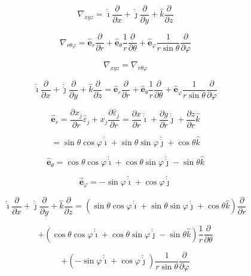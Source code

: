 \documentclass[12pt]{article}
\begin{document}
\[
    \nabla_{xyz} =  \hat{\dot{\imath}} \frac{\partial}{\partial x}
    + \hat{\dot{\jmath}} \frac{\partial}{\partial y}
    +  \hat{k} \frac{\partial}{\partial z}
\]

\[
    \nabla_{r \theta \varphi } = \hat{\textbf{e}}_r \frac{\partial}{\partial r}
    + \hat{\textbf{e}}_\theta \frac{1}{r} \frac{\partial}{\partial \theta}
    + \hat{\textbf{e}}_\varphi \frac{1}{r \sin{\theta}} \frac{\partial}{\partial \varphi}
\]

\[
    \nabla_{xyz} = \nabla_{r \theta \varphi }
\]

\[
    \hat{\dot{\imath}} \frac{\partial}{\partial x}
    + \hat{\dot{\jmath}} \frac{\partial}{\partial y}
    +  \hat{k} \frac{\partial}{\partial z} = \hat{\textbf{e}}_r \frac{\partial}{\partial r}
    + \hat{\textbf{e}}_\theta \frac{1}{r} \frac{\partial}{\partial \theta}
    + \hat{\textbf{e}}_\varphi \frac{1}{r \sin{\theta}} \frac{\partial}{\partial \varphi}
\]

\[
    \hat{\textbf{e}}_r = \frac{\partial x_j}{\partial r} \hat{\varepsilon}_j
    + x_j \frac{\partial \hat{\varepsilon}_j}{\partial r} = \frac{\partial x}{\partial r} \hat{\dot{\imath}}
    + \frac{\partial y}{\partial r} \hat{\dot{\jmath}} + \frac{\partial z}{\partial r} \hat{k}
\]

\[
    = \sin{\theta} \cos{\varphi} \hat{\dot{\imath}} + \sin{\theta} \sin{\varphi} \hat{\dot{\jmath}}
    + \cos{\theta} \hat{k}
\]

\[
    \hat{\textbf{e}}_\theta = \cos{\theta} \cos{\varphi} \hat{\dot{\imath}}
    + \cos{\theta} \sin{\varphi} \hat{\dot{\jmath}} - \sin{\theta} \hat{k}
\]

\[
    \hat{\textbf{e}}_\varphi = -\sin{\varphi} \hat{\dot{\imath}} + \cos{\varphi} \hat{\dot{\jmath}}
\]

\[
    \hat{\dot{\imath}} \frac{\partial}{\partial x} + \hat{\dot{\jmath}} \frac{\partial}{\partial y}
    +  \hat{k} \frac{\partial}{\partial z} =
    \left(
    \sin{\theta} \cos{\varphi} \hat{\dot{\imath}}
    + \sin{\theta} \sin{\varphi} \hat{\dot{\jmath}}
    + \cos{\theta} \hat{k}
    \right)  \frac{\partial}{\partial r}
\]

\[
    + \left(
    \cos{\theta} \cos{\varphi} \hat{\dot{\imath}} + \cos{\theta} \sin{\varphi} \hat{\dot{\jmath}}
    - \sin{\theta} \hat{k}
    \right) \frac{1}{r} \frac{\partial}{\partial \theta}
\]

\[
    + \left(-\sin{\varphi} \hat{\dot{\imath}} + \cos{\varphi} \hat{\dot{\jmath}}\right)
    \frac{1}{r \sin{\theta}} \frac{\partial}{\partial \varphi}
\]
\end{document}
